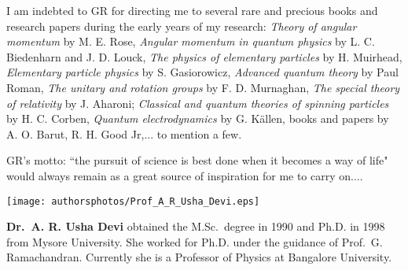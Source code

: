 I am indebted to GR for directing me to several rare and precious books and research papers during the early years of my research: \textit{Theory of angular momentum} by M. E. Rose, \textit{Angular momentum in quantum physics} by L. C. Biedenharn and J. D. Louck, \textit{The physics of elementary particles} by H. Muirhead, \textit{Elementary particle physics} by S. Gasiorowicz, \textit{Advanced quantum theory} by Paul Roman, \textit{The unitary and rotation groups} by F. D. Murnaghan, \textit{The special theory of relativity} by J. Aharoni; \textit{Classical and quantum theories of spinning particles} by H. C. Corben, \textit{Quantum electrodynamics} by G. K\"{a}llen, books and papers by A. O. Barut, R. H. Good Jr,... to mention a few.

GR's motto: ``the pursuit of science is best done when it becomes a way of life" would always remain as a great source of inspiration for me to carry on....
\vskip 1cm

\centerline{\texttt{[image: authorsphotos/Prof\_A\_R\_Usha\_Devi.eps]}}
\medskip

\noindent
\textbf{Dr.\ A. R. Usha Devi} obtained the M.Sc.\ degree in 1990 and Ph.D. in 1998 from Mysore University. She worked for Ph.D. under the guidance of Prof.\ G. Ramachandran. Currently she is a Professor of Physics at Bangalore University.
